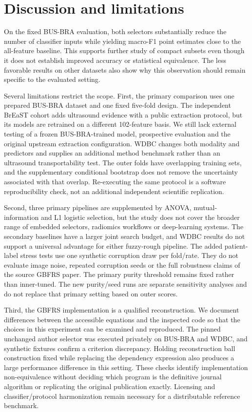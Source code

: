 \documentclass[11pt,a4paper]{article}
\begin{document}
\section{Discussion and limitations}
On the fixed BUS-BRA evaluation, both selectors substantially reduce the number of classifier inputs while yielding macro-F1 point estimates close to the all-feature baseline. This supports further study of compact subsets even though it does not establish improved accuracy or statistical equivalence. The less favorable results on other datasets also show why this observation should remain specific to the evaluated setting.

Several limitations restrict the scope. First, the primary comparison uses one prepared BUS-BRA dataset and one fixed five-fold design. The independent BrEaST cohort adds ultrasound evidence with a public extraction protocol, but its models are retrained on a different 102-feature basis. We still lack external testing of a frozen BUS-BRA-trained model, prospective evaluation and the original upstream extraction configuration. WDBC changes both modality and predictors and supplies an additional method benchmark rather than an ultrasound transportability test. The outer folds have overlapping training sets, and the supplementary conditional bootstrap does not remove the uncertainty associated with that overlap. Re-executing the same protocol is a software reproducibility check, not an additional independent scientific replication.

Second, three primary pipelines are supplemented by ANOVA, mutual-information and L1 logistic selection, but the study does not cover the broader range of embedded selectors, radiomics workflows or deep-learning systems. The secondary baselines have a larger joint search budget, and WDBC results do not support a universal advantage for either fuzzy-rough pipeline. The added patient-label stress tests use one synthetic corruption draw per fold/rate. They do not evaluate image noise, repeated corruption seeds or the full robustness claims of the source GBFRS paper. The primary purity threshold remains fixed rather than inner-tuned. The new purity/seed runs are separate sensitivity analyses and do not replace that primary setting based on outer scores.

Third, the GBFRS implementation is a qualified reconstruction. We document differences between the accessible equations and the inspected code so that the choices in this experiment can be examined and reproduced. The pinned unchanged author selector was executed privately on BUS-BRA and WDBC, and synthetic fixtures confirm a criterion discrepancy. Holding reconstruction ball construction fixed while replacing the dependency expression also produces a large performance difference in this setting. These checks identify implementation non-equivalence without deciding which program is the definitive journal algorithm or replicating the original publication exactly. Licensing and classifier/protocol harmonization remain necessary for a distributable reference benchmark.
\end{document}
